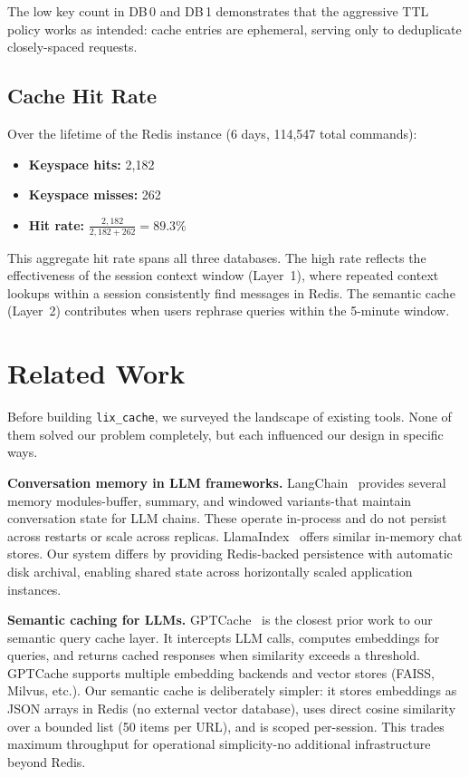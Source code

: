 \documentclass[conference]{IEEEtran}
\begin{document}
The low key count in DB\,0 and DB\,1 demonstrates that the aggressive TTL policy works as intended: cache entries are ephemeral, serving only to deduplicate closely-spaced requests.

\subsection{Cache Hit Rate}

Over the lifetime of the Redis instance (6 days, 114{,}547 total commands):

\begin{itemize}
\item \textbf{Keyspace hits:} 2{,}182
\item \textbf{Keyspace misses:} 262
\item \textbf{Hit rate:} $\frac{2{,}182}{2{,}182 + 262} = \mathbf{89.3\%}$
\end{itemize}

This aggregate hit rate spans all three databases. The high rate reflects the effectiveness of the session context window (Layer~1), where repeated context lookups within a session consistently find messages in Redis. The semantic cache (Layer~2) contributes when users rephrase queries within the 5-minute window.

\section{Related Work}
\label{sec:related}

Before building \texttt{lix\_cache}, we surveyed the landscape of existing tools. None of them solved our problem completely, but each influenced our design in specific ways.

\textbf{Conversation memory in LLM frameworks.}
LangChain~\cite{langchain2023} provides several memory modules-buffer, summary, and windowed variants-that maintain conversation state for LLM chains. These operate in-process and do not persist across restarts or scale across replicas. LlamaIndex~\cite{llamaindex2023} offers similar in-memory chat stores. Our system differs by providing Redis-backed persistence with automatic disk archival, enabling shared state across horizontally scaled application instances.

\textbf{Semantic caching for LLMs.}
GPTCache~\cite{gptcache2023} is the closest prior work to our semantic query cache layer. It intercepts LLM calls, computes embeddings for queries, and returns cached responses when similarity exceeds a threshold. GPTCache supports multiple embedding backends and vector stores (FAISS, Milvus, etc.). Our semantic cache is deliberately simpler: it stores embeddings as JSON arrays in Redis (no external vector database), uses direct cosine similarity over a bounded list (50 items per URL), and is scoped per-session. This trades maximum throughput for operational simplicity-no additional infrastructure beyond Redis.
\end{document}
